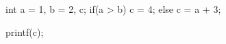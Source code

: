 \begin{minipage}[t]{2.5in}
\begin{AVerb}[numbers=left]
int a = 1, b = 2, c; \label{lst_back1_assign}
if(a > b) \label{lst_back1_test}
  c = 4; \label{lst_back1_test_true}
else     
  c = a + 3; \label{lst_back1_test_false}

printf(c); \label{lst_back1_print}
\end{AVerb}
\end{minipage}
